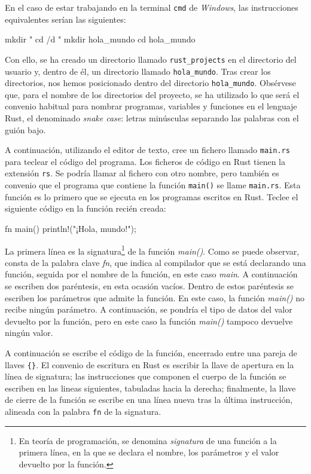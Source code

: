 En el caso de estar trabajando en la terminal \texttt{cmd} de \textit{Windows}, las instrucciones equivalentes serían las siguientes:
\begin{Codigo}
mkdir "%
cd /d "%
mkdir hola_mundo
cd hola_mundo
\end{Codigo}

Con ello, se ha creado un directorio llamado \texttt{rust\_projects} en el directorio del usuario y, dentro de él, un directorio llamado \texttt{hola\_mundo}. Tras crear los directorios, nos hemos posicionado dentro del directorio \texttt{hola\_mundo}. Obsérvese que, para el nombre de los directorios del proyecto, se ha utilizado lo que será el convenio habitual para nombrar programas, variables y funciones en el lenguaje Rust, el denominado \textit{snake case}: letras minúsculas separando las palabras con el guión bajo.

A continuación, utilizando el editor de texto, cree un fichero llamado \texttt{main.rs} para teclear el código del programa. Los ficheros de código en Rust tienen la extensión \texttt{rs}. Se podría llamar al fichero con otro nombre, pero también es convenio que el programa que contiene la función \texttt{main()} se llame \texttt{main.rs}. Esta función  es lo primero que se ejecuta en los programas escritos en Rust. Teclee el siguiente código en la función recién creada:

\begin{Codigo}
fn main() {
   println!("¡Hola, mundo!");
}
\end{Codigo}

La primera línea es la signatura\footnote{En teoría de programación, se denomina \textit{signatura} de una función a la primera línea, en la que se declara el nombre, los parámetros y el valor devuelto por la función.} de la función \textit{main()}. Como se puede observar, consta de la palabra clave \textit{fn},
que indica al compilador que se está declarando una función, seguida por el nombre de la función, en este caso \textit{main}. A continuación se escriben dos paréntesis, en esta ocasión vacíos. Dentro de estos paréntesis se escriben los parámetros que admite la función. En este caso, la función \textit{main()} no recibe ningún parámetro. A continuación, se pondría el tipo de datos del valor devuelto por la función, pero en este caso la función \textit{main()} tampoco devuelve ningún valor.

A continuación se escribe el código de la función, encerrado entre una pareja de llaves \texttt{\{\}}. El convenio de escritura en Rust es escribir la llave de apertura en la línea de signatura; las instrucciones que componen el cuerpo de la función se escriben en las lineas siguientes, tabuladas hacia la derecha; finalmente, la llave de cierre de la función se escribe en una línea nueva tras la última instrucción, alineada con la palabra \texttt{fn} de la signatura.

